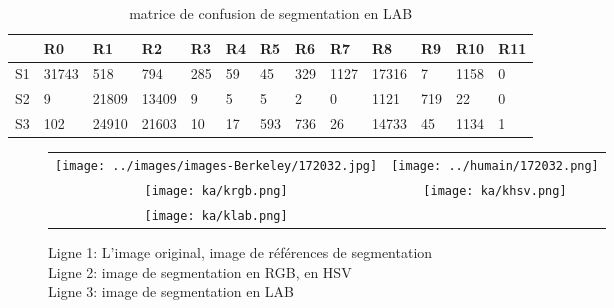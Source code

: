 \documentclass[article=a4, fontsize=11pt]{scrartcl}	%
\begin{document}
\begin{table}[!ht]
	\begin{center}
	    \begin{tabular}{| l | l | l | l | l | l | l | l | l | l | l | l | l |  }
	    	\hline
	    	  & R0 & R1 & R2 & R3 & R4 & R5 & R6 & R7 & R8 & R9 & R10 & R11\\
	    	\hline
	    	S1 & 31743 & 518 & 794 & 285 & 59 & 45 & 329 & 1127 & 17316 & 7 & 1158 & 0 \\
	    	\hline
	    	S2 & 9 & 21809 & 13409 & 9 & 5 & 5 & 2 & 0 & 1121 & 719 & 22 & 0 \\
	    	\hline
	    	S3 & 102 & 24910 & 21603 & 10 & 17  & 593 & 736 & 26 & 14733 & 45 & 1134 & 1 \\
	    	\hline
	    \end{tabular}
	\end{center}
	\caption {matrice de confusion de segmentation en LAB}
\end{table}

\clearpage
\begin{figure}[!ht]
	\begin{center}
		\begin{tabular}[h]{cc}
			\texttt{[image: ../images/images-Berkeley/172032.jpg]}&
			\texttt{[image: ../humain/172032.png]}\\
						
			\texttt{[image: ka/krgb.png]}&
			\texttt{[image: ka/khsv.png]}\\
			\texttt{[image: ka/klab.png]}& 
		\end{tabular}
	\end{center}
	\caption{Ligne 1: L'image original, image de références de segmentation\\
			 Ligne 2: image de segmentation en RGB, en HSV \\
			 Ligne 3: image de segmentation en LAB}		
\end{figure}
\end{document}

